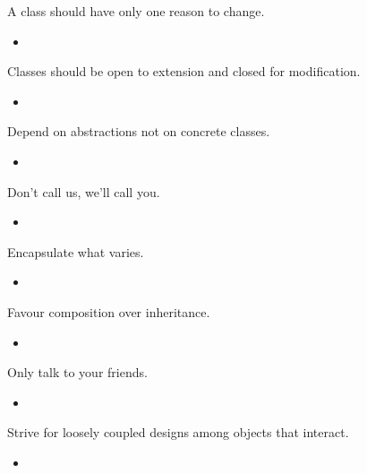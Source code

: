 \documentclass{beamer}
\begin{document}
\begin{frame}{}
    
\end{frame}

\begin{frame}{A class should have only one reason to change.}
    \begin{itemize}
        \item
    \end{itemize}
\end{frame}

\begin{frame}{Classes should be open to extension and closed for modification.}
    \begin{itemize}
        \item
    \end{itemize}
\end{frame}

\begin{frame}{Depend on abstractions not on concrete classes.}
    \begin{itemize}
        \item
    \end{itemize}
\end{frame}

\begin{frame}{Don't call us, we'll call you.}
    \begin{itemize}
        \item
    \end{itemize}
\end{frame}

\begin{frame}{Encapsulate what varies.}
    \begin{itemize}
        \item
    \end{itemize}
\end{frame}

\begin{frame}{Favour composition over inheritance.}
    \begin{itemize}
        \item
    \end{itemize}
\end{frame}

\begin{frame}{Only talk to your friends.}
    \begin{itemize}
        \item
    \end{itemize}
\end{frame}

\begin{frame}{Strive for loosely coupled designs among objects that interact.}
    \begin{itemize}
        \item
    \end{itemize}
\end{frame}
\end{document}
